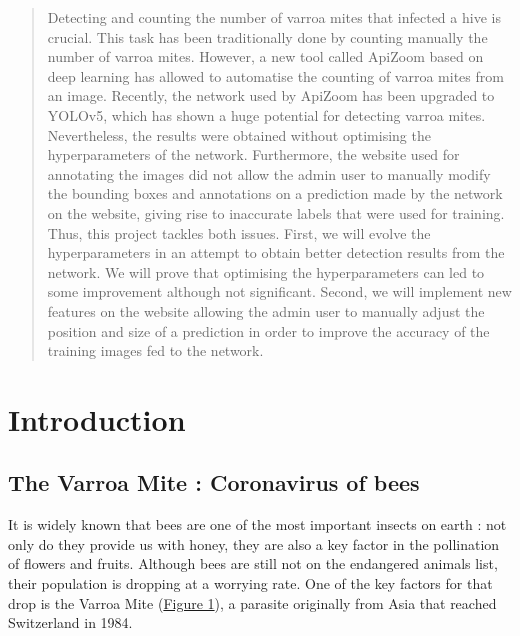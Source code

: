 \documentclass{article}
\begin{document}
\newpage


\begin{abstract}

    Detecting and counting the number of varroa mites that infected a hive is crucial. This task has been traditionally done by counting manually the number of varroa mites. However, a new tool called ApiZoom based on deep learning has allowed to automatise the counting of varroa mites from an image. Recently, the network used by ApiZoom has been upgraded to YOLOv5, which has shown a huge potential for detecting varroa mites. Nevertheless, the results were obtained without optimising the hyperparameters of the network. Furthermore, the website used for annotating the images   did not allow the admin user to manually modify the bounding boxes and annotations on a prediction made by the network on the website, giving rise to inaccurate labels that were used for training. Thus, this project tackles both issues. First, we will evolve the hyperparameters in an attempt to obtain better detection results from the network. We will prove that optimising the hyperparameters can led to some improvement although not significant.  Second,  we will implement new features on the website allowing the admin user to manually adjust the position and size of a prediction in order to improve the accuracy of the training images fed to the network.
    
    
\end{abstract}

\newpage

\tableofcontents
\vfill


\newpage
\section{Introduction}

\subsection{The Varroa Mite : Coronavirus of bees}

It is widely known that bees are one of the most important insects on earth : not only do they provide us with honey, they are also a key factor in the pollination of flowers and fruits. Although bees are still not on the endangered animals list, their population is dropping at a worrying rate. One of the key factors for that drop is the Varroa Mite (\hyperref[Figure 1]{Figure 1}), a parasite originally from Asia that reached Switzerland in 1984. 
\end{document}
